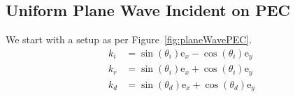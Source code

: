 \documentclass{article}
\numberwithin{equation}{section}
\begin{document}
        \subsection{Uniform Plane Wave Incident on PEC}    
            We start with a setup as per Figure~\ref{fig:planeWavePEC}. 
            \begin{subequations}
                \begin{align}
                    k_i &= \sin (\theta_i) \text{e}_x - \cos (\theta_i) \text{e}_y \\
                    k_r &= \sin (\theta_i) \text{e}_x + \cos (\theta_i) \text{e}_y \\
                    k_d &= \sin (\theta_d) \text{e}_x + \cos (\theta_d) \text{e}_y
                \end{align}
            \end{subequations}
            \vspace*{\fill}
\end{document}
